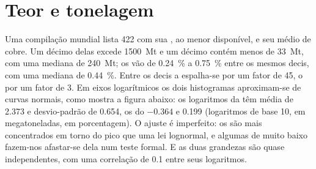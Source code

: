 \section{Teor e tonelagem}\label{sec:b2:ore-deposits:grade-tonnage}

Uma compilação mundial lista 422  com sua , ao menor 
disponível, e seu  médio de cobre. Um décimo delas excede \qty{1500}{Mt} e um décimo contém menos
de \qty{33}{Mt}, com uma mediana de \qty{240}{Mt}; os  vão de \qty{0.24}{\percent} a
\qty{0.75}{\percent} entre os mesmos decis, com uma mediana de \qty{0.44}{\percent}. Entre os
decis a  espalha-se por um fator de 45, o  por um fator de 3. Em eixos logarítmicos os dois histogramas aproximam-se de curvas normais, como mostra a figura abaixo:
os logaritmos da  têm média de 2.373 e desvio-padrão de 0.654, os do 
$-0.364$ e 0.199 (logaritmos de base 10,  em megatoneladas,  em porcentagem). O ajuste é
imperfeito: os  são mais concentrados em torno do pico que uma lei lognormal, e algumas  de  muito baixo fazem-nos
afastar-se dela num teste formal. E as duas grandezas são quase independentes, com uma correlação de
0.1 entre seus logaritmos.


